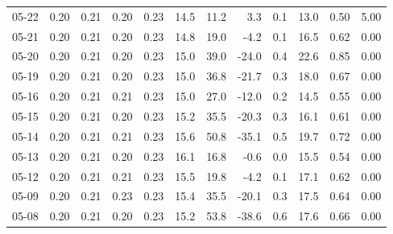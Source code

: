 \begin{threeparttable}
{\begin{tabular}{lrrrrrrrrrrr}
  05-22 &          0.20 &          0.21 &          0.20 &        0.23 &                14.5 &                11.2 &        3.3 &                 0.1 &             13.0 &            0.50 &                   5.00 \\
  05-21 &          0.20 &          0.21 &          0.20 &        0.23 &                14.8 &                19.0 &       -4.2 &                 0.1 &             16.5 &            0.62 &                   0.00 \\
  05-20 &          0.20 &          0.21 &          0.20 &        0.23 &                15.0 &                39.0 &      -24.0 &                 0.4 &             22.6 &            0.85 &                   0.00 \\
  05-19 &          0.20 &          0.21 &          0.20 &        0.23 &                15.0 &                36.8 &      -21.7 &                 0.3 &             18.0 &            0.67 &                   0.00 \\
  05-16 &          0.20 &          0.21 &          0.21 &        0.23 &                15.0 &                27.0 &      -12.0 &                 0.2 &             14.5 &            0.55 &                   0.00 \\
  05-15 &          0.20 &          0.21 &          0.20 &        0.23 &                15.2 &                35.5 &      -20.3 &                 0.3 &             16.1 &            0.61 &                   0.00 \\
  05-14 &          0.20 &          0.21 &          0.21 &        0.23 &                15.6 &                50.8 &      -35.1 &                 0.5 &             19.7 &            0.72 &                   0.00 \\
  05-13 &          0.20 &          0.21 &          0.20 &        0.23 &                16.1 &                16.8 &       -0.6 &                 0.0 &             15.5 &            0.54 &                   0.00 \\
  05-12 &          0.20 &          0.21 &          0.21 &        0.23 &                15.5 &                19.8 &       -4.2 &                 0.1 &             17.1 &            0.62 &                   0.00 \\
  05-09 &          0.20 &          0.21 &          0.23 &        0.23 &                15.4 &                35.5 &      -20.1 &                 0.3 &             17.5 &            0.64 &                   0.00 \\
  05-08 &          0.20 &          0.21 &          0.20 &        0.23 &                15.2 &                53.8 &      -38.6 &                 0.6 &             17.6 &            0.66 &                   0.00 \\

\end{tabular}}
\end{threeparttable}
